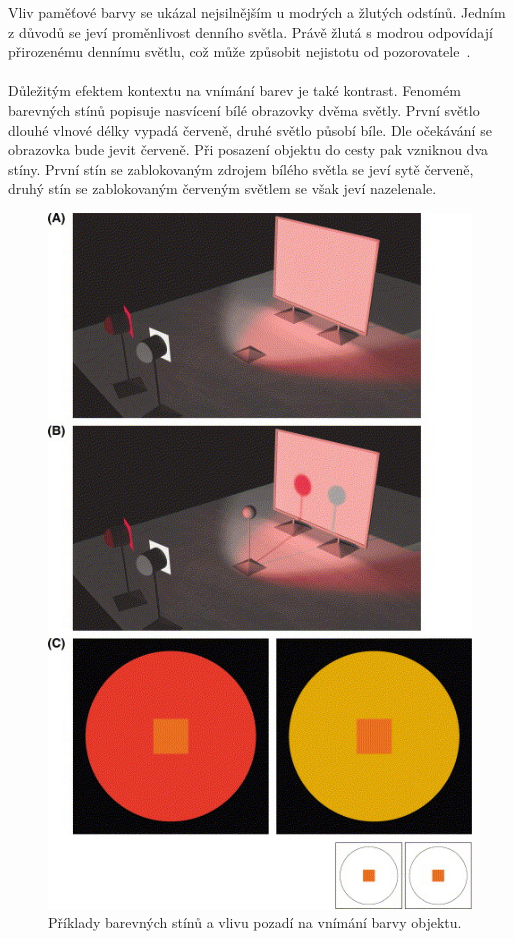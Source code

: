 Vliv paměťové barvy se ukázal nejsilnějším u modrých a žlutých odstínů. Jedním z důvodů se jeví proměnlivost denního světla. Právě žlutá s modrou
odpovídají přirozenému dennímu světlu, což může způsobit nejistotu od pozorovatele~\cite{color-perception}.
\\
\\
Důležitým efektem kontextu na vnímání barev je také kontrast. Fenomém barevných stínů popisuje nasvícení
bílé obrazovky dvěma světly. První světlo dlouhé vlnové délky vypadá červeně, druhé světlo působí bíle. Dle
očekávání se obrazovka bude jevit červeně. Při posazení objektu do cesty pak vzniknou dva stíny. První stín se
zablokovaným zdrojem bílého světla se jeví sytě červeně, druhý stín se zablokovaným červeným světlem se však jeví nazelenale.

\begin{figure}[!ht]
    \centering
    \includegraphics[width=0.65\linewidth]{images/contrast.jpg}
    \caption{Příklady barevných stínů a vlivu pozadí na vnímání barvy objektu.~\cite{BEAULOTTO2002609}}
    \label{fig:Kontrasty}
\end{figure}

